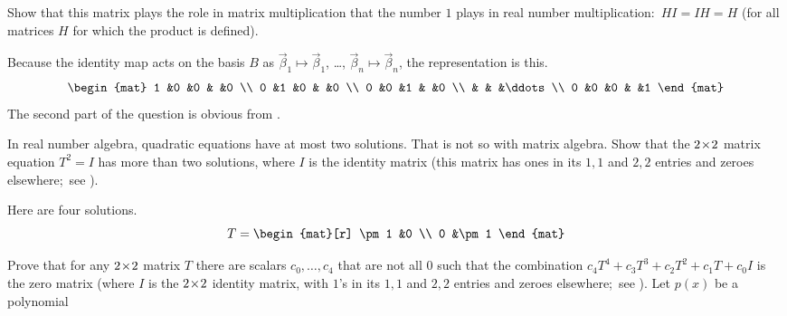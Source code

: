 \begin{exercises}
    Show that this matrix plays the role in matrix multiplication that the
    number $1$ plays in real number multiplication:~$HI=IH=H$ (for all matrices
    $H$ for which the product is defined).
    \begin{answer}
      Because the identity map acts on the basis $B$ as
      $\vec{\beta}_1\mapsto\vec{\beta}_1$, \ldots,
      $\vec{\beta}_n\mapsto\vec{\beta}_n$,
      the representation is this.
      \begin{equation*}
        \begin{mat}
          1  &0  &0  &  &0 \\
          0  &1  &0  &  &0 \\
          0  &0  &1  &  &0 \\
             &   &   &\ddots  \\
          0  &0  &0  &  &1
        \end{mat}
      \end{equation*}
      The second part of the question is obvious from 
      .
    \end{answer}
  \item 
    In real number algebra, quadratic equations have at most two solutions.
    That is not so with matrix algebra.
    Show that the \( 2 \! \times \! 2 \) matrix equation \( T^2=I \)
    has more than two solutions,
    where $I$ is the identity matrix
    (this matrix has ones in its $1,1$ and $2,2$ entries and zeroes 
    elsewhere;~see ).
    \begin{answer}
      Here are four solutions.
      \begin{equation*}
        T=\begin{mat}[r]
          \pm 1  &0  \\
          0      &\pm 1
        \end{mat}
      \end{equation*}  
    \end{answer}
  \item 
    \begin{exparts}
      \partsitem Prove that for any \( 2 \! \times \! 2 \) matrix \( T \) 
        there are scalars
        \( c_0,\dots,c_4 \) that are not all $0$ such that the combination
        $c_4T^4+c_3T^3+c_2T^2+c_1T+c_0I$
        is the zero matrix
        (where $I$ is the $2 \! \times \! 2$ identity matrix, with $1$'s in its
        $1,1$ and $2,2$ entries and zeroes elsewhere;~see
        ).
      \partsitem Let \( p(x) \) be a polynomial 

\end{exparts}
\end{exercises}
